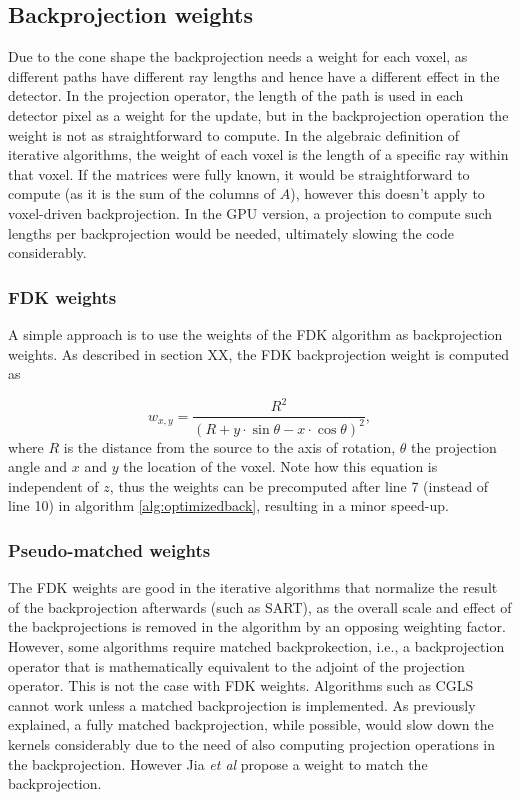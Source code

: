 \subsection{Backprojection weights}\label{sec:weights}

Due to the cone shape the backprojection needs a weight for each voxel, as different paths have different ray lengths and hence have a different effect in the detector. In the projection operator, the length of the path is used in each detector pixel as a weight for the update, but in the backprojection operation the weight is not as straightforward to compute. In the algebraic definition of iterative algorithms, the weight of each voxel is the length of a specific ray within that voxel. If the matrices were fully known, it would be straightforward to compute (as it is the sum of the columns of $A$), however this doesn't apply to voxel-driven backprojection. In the GPU version, a projection to compute such lengths per backprojection would be needed, ultimately slowing the code considerably.

\subsubsection*{FDK weights}
A simple approach is to use the weights of the FDK algorithm as backprojection weights. As described in section XX, the FDK backprojection weight is computed as

\begin{equation}
w_{x,y}=\frac{R^2}{(R+y\cdot \sin\theta-x\cdot\cos\theta)^2},
\end{equation}
where $R$ is the distance from the source to the axis of rotation, $\theta$ the projection angle and $x$ and $y$ the location of the voxel. Note how this equation is independent of $z$, thus the weights can be precomputed after line 7 (instead of line 10) in algorithm \ref{alg:optimizedback}, resulting in a minor speed-up.


\subsubsection*{Pseudo-matched weights}
The FDK weights are good in the iterative algorithms that normalize the result of the backprojection afterwards (such as SART), as the overall scale and effect of the backprojections is removed in the algorithm by an opposing weighting factor. However, some algorithms require matched backprokection, i.e., a backprojection operator that is mathematically equivalent to the adjoint of the projection operator. This is not the case with FDK weights. Algorithms such as CGLS cannot work unless a matched backprojection is implemented. As previously explained, a fully matched backprojection, while possible, would slow down the kernels considerably due to the need of also computing projection operations in the backprojection. However Jia \textit{et al}\cite{jia2011gpu} propose a weight to match the backprojection.

